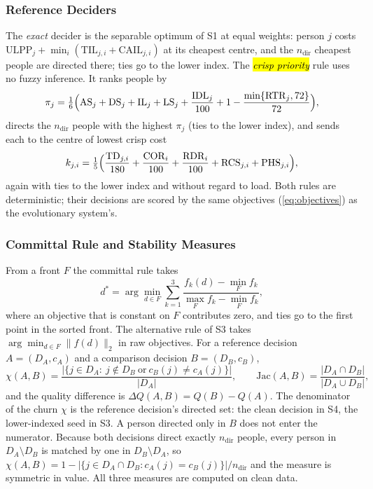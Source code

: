 \documentclass[systems,article,accept,moreauthors,pdftex]{Definitions/mdpi}
\begin{document}
\subsubsection{Reference Deciders}
The \emph{exact} decider is the separable optimum of S1 at equal weights: person $j$ costs
$\mathrm{ULPP}_j+\min_i(\mathrm{TIL}_{j,i}+\mathrm{CAIL}_{j,i})$ at its cheapest centre, and the
$n_{\mathrm{dir}}$ cheapest people are directed there; ties go to the lower index. The
\emph{\hl{crisp priority}%
} rule uses no fuzzy inference. It ranks people by
\begin{equation}\label{eq:crisp-priority}
\pi_j=\tfrac16\Bigl(\mathrm{AS}_j+\mathrm{DS}_j+\mathrm{IL}_j+\mathrm{LS}_j+\frac{\mathrm{IDL}_j}{100}
+1-\frac{\min\{\mathrm{RTR}_j,72\}}{72}\Bigr),
\end{equation}
directs the $n_{\mathrm{dir}}$ people with the highest $\pi_j$ (ties to the lower index), and
sends each to the centre of lowest crisp cost
\begin{equation}\label{eq:crisp-cost}
k_{j,i}=\tfrac15\Bigl(\frac{\mathrm{TD}_{j,i}}{180}+\frac{\mathrm{COR}_i}{100}+\frac{\mathrm{RDR}_i}{100}
+\mathrm{RCS}_{j,i}+\mathrm{PHS}_{j,i}\Bigr),
\end{equation}
again with ties to the lower index and without regard to load. Both rules are deterministic;
their decisions are scored by the same objectives (\ref{eq:objectives}) as the evolutionary
system's.

\subsubsection{Committal Rule and Stability Measures}
From a front $F$ the committal rule takes
\begin{equation}\label{eq:committal}
d^\ast=\arg\min_{d\in F}\sum_{k=1}^{3}\frac{f_k(d)-\min_{F}f_k}{\max_{F}f_k-\min_{F}f_k},
\end{equation}
where an objective that is constant on $F$ contributes zero, and ties go to the first point
in the sorted front. The alternative rule of S3 takes $\arg\min_{d\in F}\lVert f(d)\rVert_2$
in raw objectives. For a reference decision $A=(D_A,c_A)$ and a comparison decision
$B=(D_B,c_B)$,
\begin{equation}\label{eq:churn}
\chi(A,B)=\frac{\bigl|\{j\in D_A:\ j\notin D_B\ \text{or}\ c_B(j)\neq c_A(j)\}\bigr|}{|D_A|},
\qquad
\mathrm{Jac}(A,B)=\frac{|D_A\cap D_B|}{|D_A\cup D_B|},
\end{equation}
and the quality difference is $\Delta Q(A,B)=Q(B)-Q(A)$.
The denominator of the churn $\chi$ is the reference decision's directed set: the clean
decision in S4, the lower-indexed seed in S3. A person directed only in $B$ does not enter the
numerator. Because both decisions direct exactly $n_{\mathrm{dir}}$ people, every person in
$D_A\setminus D_B$ is matched by one in $D_B\setminus D_A$, so
$\chi(A,B)=1-|\{j\in D_A\cap D_B: c_A(j)=c_B(j)\}|/n_{\mathrm{dir}}$ and the measure is
symmetric in value. All three measures are computed on clean data.
\end{document}
